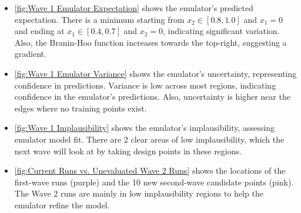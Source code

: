\documentclass[12pt]{report} %
\begin{document}
\begin{itemize}
    \item \ref{fig:Wave 1 Emulator Expectation} shows the emulator’s predicted expectation. There is a minimum starting from $x_2 \in [0.8, 1.0]$ and $x_1 = 0$ and ending at $x_1 \in [0.4, 0.7]$ and $x_2 = 0$, indicating significant variation. Also, the Branin-Hoo function increases towards the top-right, suggesting a gradient.
    \item \ref{fig:Wave 1 Emulator Variance} shows the emulator's uncertainty, representing confidence in predictions. Variance is low across most regions, indicating confidence in the emulator's predictions. Also, uncertainty is higher near the edges where no training points exist.
    \item \ref{fig:Wave 1 Implausibility} shows the emulator's implausibility, assessing emulator model fit. There are 2 clear areas of low implausibility, which the next wave will look at by taking design points in these regions.
    \item \ref{fig:Current Runs vs. Unevaluated Wave 2 Runs} shows the locations of the first-wave runs (purple) and the 10 new second-wave candidate points (pink). The Wave 2 runs are mainly in low implausibility regions to help the emulator refine the model.
\end{itemize}
\end{document}
